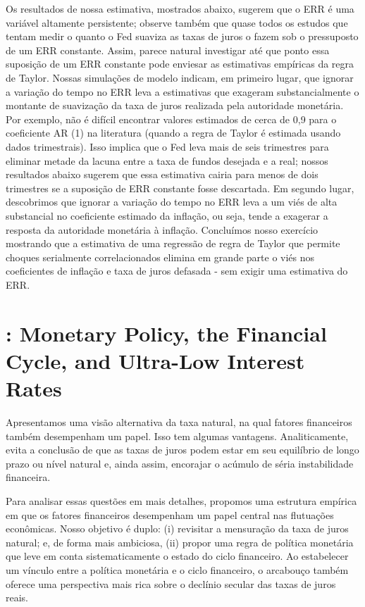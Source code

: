 Os resultados de nossa estimativa, mostrados abaixo, sugerem que o ERR é uma variável altamente persistente; observe também que quase todos os estudos que tentam medir o quanto o Fed suaviza as taxas de juros o fazem sob o pressuposto de um ERR constante. Assim, parece natural investigar até que ponto essa suposição de um ERR constante pode enviesar as estimativas empíricas da regra de Taylor. Nossas simulações de modelo indicam, em primeiro lugar, que ignorar a variação do tempo no ERR leva a estimativas que exageram substancialmente o montante de suavização da taxa de juros realizada pela autoridade monetária. Por exemplo, não é difícil encontrar valores estimados de cerca de 0,9 para o coeficiente AR (1) na literatura (quando a regra de Taylor é estimada usando dados trimestrais). Isso implica que o Fed leva mais de seis trimestres para eliminar metade da lacuna entre a taxa de fundos desejada e a real; nossos resultados abaixo sugerem que essa estimativa cairia para menos de dois trimestres se a suposição de ERR constante fosse descartada. Em segundo lugar, descobrimos que ignorar a variação do tempo no ERR leva a um viés de alta substancial no coeficiente estimado da inflação, ou seja, tende a exagerar a resposta da autoridade monetária à inflação. Concluímos nosso exercício mostrando que a estimativa de uma regressão de regra de Taylor que permite choques serialmente correlacionados elimina em grande parte o viés nos coeficientes de inflação e taxa de juros defasada - sem exigir uma estimativa do ERR.
%
%
\section{\citet{Juselius:2017}: Monetary Policy, the Financial Cycle, and Ultra-Low Interest Rates} 
Apresentamos uma visão alternativa da taxa natural, na qual fatores financeiros também desempenham um papel. Isso tem algumas vantagens. Analiticamente, evita a conclusão de que as taxas de juros podem estar em seu equilíbrio de longo prazo ou nível natural e, ainda assim, encorajar o acúmulo de séria instabilidade financeira.

Para analisar essas questões em mais detalhes, propomos uma estrutura empírica em que os fatores financeiros desempenham um papel central nas flutuações econômicas. Nosso objetivo é duplo: (i) revisitar a mensuração da taxa de juros natural; e, de forma mais ambiciosa, (ii) propor uma regra de política monetária que leve em conta sistematicamente o estado do ciclo financeiro. Ao estabelecer um vínculo entre a política monetária e o ciclo financeiro, o arcabouço também oferece uma perspectiva mais rica sobre o declínio secular das taxas de juros reais.

